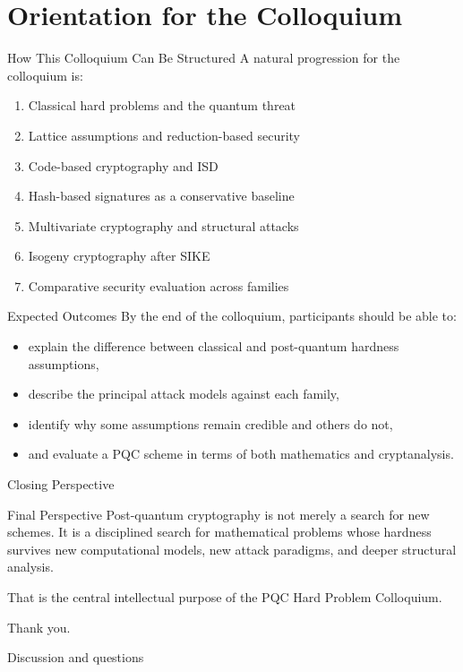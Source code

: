 \documentclass[aspectratio=169]{beamer}
\begin{document}
	\section{Orientation for the Colloquium}
	
	\begin{frame}{How This Colloquium Can Be Structured}
		A natural progression for the colloquium is:
		\begin{enumerate}
			\item Classical hard problems and the quantum threat
			\item Lattice assumptions and reduction-based security
			\item Code-based cryptography and ISD
			\item Hash-based signatures as a conservative baseline
			\item Multivariate cryptography and structural attacks
			\item Isogeny cryptography after SIKE
			\item Comparative security evaluation across families
		\end{enumerate}
	\end{frame}
	
	\begin{frame}{Expected Outcomes}
		By the end of the colloquium, participants should be able to:
		\begin{itemize}
			\item explain the difference between classical and post-quantum hardness assumptions,
			\item describe the principal attack models against each family,
			\item identify why some assumptions remain credible and others do not,
			\item and evaluate a PQC scheme in terms of both mathematics and cryptanalysis.
		\end{itemize}
	\end{frame}
	
	\begin{frame}{Closing Perspective}
		\begin{block}{Final Perspective}
			Post-quantum cryptography is not merely a search for new schemes. It is a disciplined search for mathematical problems whose hardness survives new computational models, new attack paradigms, and deeper structural analysis.
		\end{block}
		
		\vspace{0.75em}
		That is the central intellectual purpose of the PQC Hard Problem Colloquium.
	\end{frame}
	
	\begin{frame}
		\centering
		{\LARGE Thank you.}
		
		\vspace{0.5em}
		{\large Discussion and questions}
	\end{frame}
	
\end{document}
